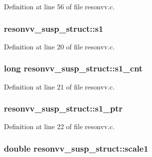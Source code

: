Definition at line 56 of file resonvv.\+c.

\subsubsection[{\texorpdfstring{s1}{s1}}]{ resonvv\+\_\+susp\+\_\+struct\+::s1}\hypertarget{structresonvv__susp__struct_a07b16b9e007b3f6efc2a31a57c9e16c3}{}\label{structresonvv__susp__struct_a07b16b9e007b3f6efc2a31a57c9e16c3}


Definition at line 20 of file resonvv.\+c.

\subsubsection[{\texorpdfstring{s1\+\_\+cnt}{s1_cnt}}]{\setlength{\rightskip}{0pt plus 5cm}long resonvv\+\_\+susp\+\_\+struct\+::s1\+\_\+cnt}\hypertarget{structresonvv__susp__struct_a92b27cffa1a042ad560f8811abdead54}{}\label{structresonvv__susp__struct_a92b27cffa1a042ad560f8811abdead54}


Definition at line 21 of file resonvv.\+c.

\subsubsection[{\texorpdfstring{s1\+\_\+ptr}{s1_ptr}}]{ resonvv\+\_\+susp\+\_\+struct\+::s1\+\_\+ptr}\hypertarget{structresonvv__susp__struct_a4427c5d3c8b76f5fa11e60b0c32f8e93}{}\label{structresonvv__susp__struct_a4427c5d3c8b76f5fa11e60b0c32f8e93}


Definition at line 22 of file resonvv.\+c.

\subsubsection[{\texorpdfstring{scale1}{scale1}}]{\setlength{\rightskip}{0pt plus 5cm}double resonvv\+\_\+susp\+\_\+struct\+::scale1}\hypertarget{structresonvv__susp__struct_a45842d0fa92c59ded8e73f97132bd5c6}{}\label{structresonvv__susp__struct_a45842d0fa92c59ded8e73f97132bd5c6}


